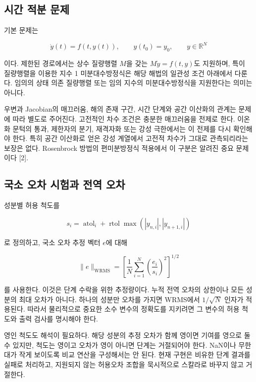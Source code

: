 \documentclass[
  10pt,
  a4paper,
]{article}
\begin{document}
\hypertarget{uxc2dcuxac04-uxc801uxbd84-uxbb38uxc81c}{%
\subsection{시간 적분
문제}\label{uxc2dcuxac04-uxc801uxbd84-uxbb38uxc81c}}

기본 문제는

\[
\dot y(t)=f(t,y(t)),\qquad y(t_0)=y_0,\qquad y\in\mathbb R^N
\]

이다. 제한된 경로에서는 상수 질량행렬 \(M\)을 갖는 \(M\dot y=f(t,y)\)도
지원하며, 특이 질량행렬을 이용한 지수 1 미분대수방정식은 해당 해법의
일관성 조건 아래에서 다룬다. 임의의 상태 의존 질량행렬 또는 임의 지수의
미분대수방정식을 지원한다는 의미는 아니다.

우변과 Jacobian의 매끄러움, 해의 존재 구간, 시간 단계와 공간 이산화의
관계는 문제에 따라 별도로 주어진다. 고전적인 차수 조건은 충분한
매끄러움을 전제로 한다. 이온화 문턱의 통과, 제한자의 분기, 재격자화 또는
강성 극한에서는 이 전제를 다시 확인해야 한다. 특히 공간 이산화로 얻은
강성 계열에서 고전적 차수가 그대로 관측되리라는 보장은 없다. Rosenbrock
방법의 편미분방정식 적용에서 이 구분은 알려진 중요 문제이다 {[}2{]}.

\hypertarget{uxad6duxc18c-uxc624uxcc28-uxc2dcuxd5d8uxacfc-uxc804uxc5ed-uxc624uxcc28}{%
\subsection{국소 오차 시험과 전역
오차}\label{uxad6duxc18c-uxc624uxcc28-uxc2dcuxd5d8uxacfc-uxc804uxc5ed-uxc624uxcc28}}

성분별 허용 척도를

\[
s_i=\operatorname{atol}_i+\operatorname{rtol}\max(|y_{n,i}|,|y_{n+1,i}|)
\]

로 정의하고, 국소 오차 추정 벡터 \(e\)에 대해

\[
\|e\|_{\mathrm{WRMS}}=
\left[\frac1N\sum_{i=1}^N\left(\frac{e_i}{s_i}\right)^2\right]^{1/2}
\]

를 사용한다. 이것은 단계 수락을 위한 추정량이다. 누적 전역 오차의
상한이나 모든 성분의 최대 오차가 아니다. 하나의 성분만 오차를 가지면
WRMS에서 \(1/\sqrt N\) 인자가 적용된다. 따라서 물리적으로 중요한 소수
변수의 정확도를 지키려면 그 변수의 허용 척도와 출력 검사를 명시해야
한다.

영인 척도도 해석이 필요하다. 해당 성분의 추정 오차가 함께 영이면 기여를
영으로 둘 수 있지만, 척도는 영이고 오차가 영이 아니면 단계는 거절되어야
한다. NaN이나 무한대가 작게 보이도록 비교 연산을 구성해서는 안 된다.
현재 구현은 비유한 단계 결과를 실패로 처리하고, 지원되지 않는 허용오차
조합을 묵시적으로 스칼라로 바꾸지 않고 거절한다.
\end{document}
